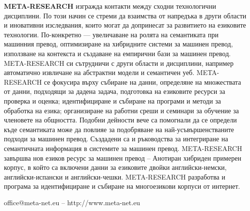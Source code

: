 \documentclass[]{../../metanetpaper}
\begin{document}
\begin{multicols}{2}
\textbf{META-RESEARCH} изгражда контакти между сходни технологични
дисциплини. По този начин се стреми да взаимства от напредъка в други
области и иновативни изследвания, които могат да допринесат за
развитието на езиковите технологии.  По-конкретно — увеличаване на
ролята на семантиката при машинния превод, оптимизиране на хибридните
системи за машинен превод, използване на контекста и създаване на
емпирични бази за машинен превод. META-RESEARCH си сътрудничи с други
области и дисциплини, например автоматично извличане на абстрактни
модели и семантичен уеб.  META-RESEARCH се фокусира върху събиране на
данни, определяне на множествата от данни, подходящи за дадена задача,
подготовка на езиковите ресурси за проверка и оценка; идентифициране и
събиране на програми и методи за обработка на езика; организиране на
работни среши и семинари за обучение за членовете на
общността. Подобни дейности вече са помогнали да се определи къде
семантиката може да повлияе за подобряване на най-усъвършенстваните
подходи за машинен превод. Създадени са и ръководства за интегриране
на семантичната информация в системите за машинен
превод. META-RESEARCH завършва нов езиков ресурс за машинен превод –
Анотиран хибриден примерен корпус, в който са включени данни за
езиковите двойки английски-немски, английски-испански и
английски-чешки.  META-RESEARCH разработва и програма за
идентифициране и събиране на многоезикови корпуси от интернет.
\end{multicols}

\vfill
\centerline{office@meta-net.eu -- http://www.meta-net.eu}


\setcounter{section}{0}
\setcounter{figure}{0}

\cleardoublepage


\end{document}
